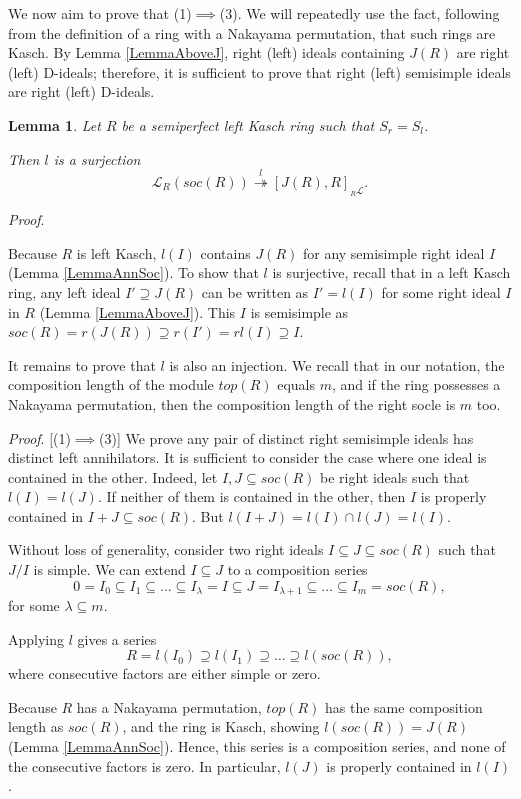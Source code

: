 \documentclass[11pt]{article}
\theoremstyle{plain}
\newtheorem{Lemma}[veta]{Lemma}
\theoremstyle{remark}
\theoremstyle{plain}
\newenvironment{Proof}{
  \par\medskip\noindent
  \textit{Proof}.
}{
\newline
\rightline{$\qedsymbol$}
}
\begin{document}
We now aim to prove that (1)$\implies$(3). We will repeatedly use the fact, following from the definition of a ring with a Nakayama permutation, that such rings are Kasch. By Lemma \ref{LemmaAboveJ}, right (left) ideals containing $J(R)$ are right (left) D-ideals; therefore, it is sufficient to prove that right (left) semisimple ideals are right (left) D-ideals. 

\begin{Lemma}\label{LemmaAnnsurj}
    Let $R$ be a semiperfect left Kasch ring such that $S_r=S_l$. 

    Then $l$ is a surjection 
    \[\mathcal{L}_R(soc(R)) \overset{l}{\twoheadrightarrow} [J(R), R]_{_R\mathcal{L}}.\]
\end{Lemma}
\begin{Proof}
Because $R$ is left Kasch, $l(I)$ contains $J(R)$ for any semisimple right ideal $I$ (Lemma \ref{LemmaAnnSoc}). To show that $l$ is surjective, recall that in a left Kasch ring, any left ideal $I'\supseteq J(R)$ can be written as $I'=l(I)$ for some right ideal $I$ in  $R$ (Lemma \ref{LemmaAboveJ}). This $I$ is semisimple as $soc(R)=r(J(R))\supseteq r(I')=rl(I)\supseteq I$. 
\end{Proof}

It remains to prove that $l$ is also an injection. We recall that in our notation, the composition length of the module $top(R)$ equals $m$, and if the ring possesses a Nakayama permutation, then the composition length of the right socle is $m$ too.

\begin{Proof}[(1)$\implies$(3)] We prove any pair of distinct right semisimple ideals has distinct left annihilators. It is sufficient to consider the case where one ideal is contained in the other. Indeed, let $I, J\subseteq soc(R)$ be right ideals such that $l(I)=l(J)$. If neither of them is contained in the other, then $I$ is properly contained in $I+J\subseteq soc(R)$. But $l(I+J)=l(I)\cap l(J)=l(I)$.

Without loss of generality, consider two right ideals $I\subseteq J\subseteq soc(R)$ such that $J/I$ is simple. We can extend $I\subseteq J$ to a composition series
\[0=I_0\subseteq I_1\subseteq \dots \subseteq I_\lambda=I\subseteq J=I_{\lambda+1}\subseteq \dots \subseteq I_{m}=soc(R),\]
    for some $\lambda\subseteq m$.

   Applying $l$ gives a series 
\[R=l(I_0)\supseteq l(I_1)\supseteq \dots \supseteq l(soc(R)),\]
where consecutive factors are either simple or zero. 

Because $R$ has a Nakayama permutation,  $top(R)$  has the same composition length as $soc(R)$, and the ring is Kasch, showing $l(soc(R))=J(R)$ (Lemma \ref{LemmaAnnSoc}). Hence, this series is a composition series, and none of the consecutive factors is zero. In particular, $l(J)$ is properly contained in $l(I)$.
\end{Proof}
\end{document}
